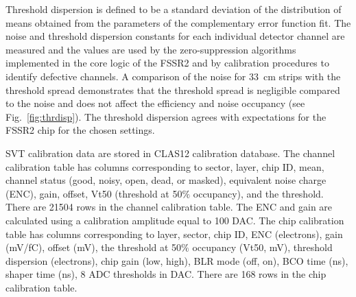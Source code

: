 Threshold dispersion is defined to be a standard deviation of the distribution of means obtained from the parameters of the complementary error function fit. The noise and threshold dispersion constants for each individual detector channel are measured and the values are used by the zero-suppression algorithms implemented in the core logic of the FSSR2 and by calibration procedures to identify defective channels. A comparison of the noise for 33~cm strips with the threshold spread demonstrates that the threshold spread is negligible compared to the noise and does not affect the efficiency and noise occupancy (see Fig.~\ref{fig:thrdisp}). The threshold dispersion agrees with expectations for the FSSR2 chip for the chosen settings.

SVT calibration data are stored in CLAS12 calibration database. The channel calibration table has columns corresponding to sector, layer, chip ID, mean, channel status (good, noisy, open, dead, or masked), equivalent noise charge (ENC), gain, offset, Vt50 (threshold at 50$\%$ occupancy), and the threshold. There are 21504 rows in the channel calibration table. The ENC and gain are calculated using a calibration amplitude equal to 100 DAC.
The chip calibration table has columns corresponding to layer, sector, chip ID, ENC (electrons), gain (mV/fC), offset (mV), the threshold at 50$\%$ occupancy (Vt50, mV), threshold dispersion (electrons), chip gain (low, high), BLR mode (off, on), BCO time (ns), shaper time (ns), 8 ADC thresholds in DAC. There are 168 rows in the chip calibration table. 

